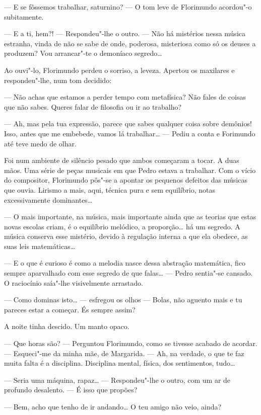 --- E se fôssemos trabalhar, saturnino? --- O tom leve de Florimundo
acordou"-o subitamente.

--- E a ti, hem?! --- Respondeu"-lhe o outro. --- Não há mistérios nessa música
estranha, vinda de não se sabe de onde, poderosa, misteriosa como só os
deuses a produzem? Vou arrancar"-te o demoníaco segredo\ldots{}

Ao ouvi"-lo, Florimundo perdeu o sorriso, a leveza. Apertou os maxilares
e respondeu"-lhe, num tom decidido:

--- Não achas que estamos a perder tempo com metafísica? Não fales de
coisas que não sabes. Queres falar de filosofia ou ir ao trabalho?

--- Ah, mas pela tua expressão, parece que sabes qualquer coisa sobre
demônios! Isso, antes que me embebede, vamos lá trabalhar\ldots{} ---
Pediu a conta e Forimundo até teve medo de olhar.

Foi num ambiente de silêncio pesado que ambos começaram a tocar. A duas
mãos. Uma série de peças musicais em que Pedro estava a trabalhar. Com o
vício do compositor, Florimundo pôs"-se a apontar os pequenos defeitos
das músicas que ouvia. Lirismo a mais, aqui, técnica pura e sem
equilíbrio, notas excessivamente dominantes\ldots{}

--- O mais importante, na música, mais importante ainda que as teorias que
estas novas escolas criam, é o equilíbrio melódico, a proporção\ldots{} há um
segredo. A música conserva esse mistério, devido à regulação interna a
que ela obedece, as suas leis matemáticas\ldots{}

--- E o que é curioso é como a melodia nasce dessa abstração matemática,
fico sempre aparvalhado com esse segredo de que falas\ldots{} --- Pedro
sentia"-se cansado. O raciocínio saía"-lhe visivelmente arrastado.

--- Como dominas isto\ldots{} --- esfregou os olhos --- Bolas, não aguento mais e tu
pareces estar a começar. És sempre assim?

A noite tinha descido. Um manto opaco.

--- Que horas são? --- Perguntou Florimundo, como se tivesse acabado de
acordar. --- Esqueci"-me da minha mãe, de Margarida. --- Ah, na verdade, o
que te faz muita falta é a disciplina. Disciplina mental, física, dos
sentimentos, tudo\ldots{}

--- Seria uma máquina, rapaz\ldots{} --- Respondeu"-lhe o outro, com um ar de
profundo desalento. --- É isso que propões?

--- Bem, acho que tenho de ir andando\ldots{} O teu amigo não veio, ainda?

